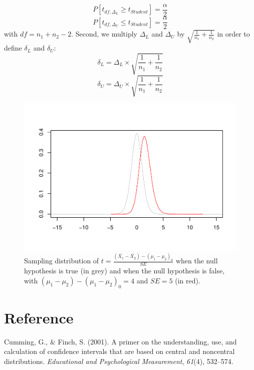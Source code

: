 \documentclass[
  english,
  man]{apa6}
\begin{document}
\[P[t_{df, \Delta_L} \geq t_{Student}] = \frac{\alpha}{2} \]
\[P[t_{df, \Delta_U} \leq t_{Student}] = \frac{\alpha}{2} \]
with \(df = n_1+n_2-2\). Second, we multiply \(\Delta_L\) and \(\Delta_U\) by \(\sqrt{\frac{1}{n_1}+\frac{1}{n_2}}\) in order to define \(\delta_L\) and \(\delta_U\):
\[\delta_L = \Delta_L \times \sqrt{\frac{1}{n_1}+\frac{1}{n_2}}\]
\[\delta_U = \Delta_U \times \sqrt{\frac{1}{n_1}+\frac{1}{n_2}}\]

\begin{figure}
\centering
\includegraphics{CI_files/figure-latex/SAMPLMEANDIFF3-1.pdf}
\caption{\label{fig:SAMPLMEANDIFF3}Sampling distribution of \(t=\frac{(\bar{X_1}-\bar{X_2})-(\mu_1-\mu_2)_0}{SE}\) when the null hypothesis is true (in grey) and when the null hypothesis is false, with \((\mu_1-\mu_2)-(\mu_1-\mu_2)_0=4\) and \(SE=5\) (in red).}
\end{figure}

\hypertarget{reference}{%
\section*{Reference}\label{reference}}

\hypertarget{refs}{}
\leavevmode\hypertarget{ref-Cumming_Finch_2001}{}%
Cumming, G., \& Finch, S. (2001). A primer on the understanding, use, and calculation of confidence intervals that are based on central and noncentral distributions. \emph{Educational and Psychological Measurement}, \emph{61}(4), 532--574.
\end{document}

